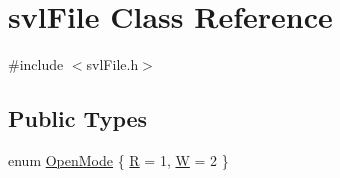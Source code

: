 \hypertarget{classsvl_file}{}\section{svl\+File Class Reference}
\label{classsvl_file}


{\ttfamily \#include $<$svl\+File.\+h$>$}

\subsection*{Public Types}
\begin{DoxyCompactItemize}
\item 
enum \hyperlink{classsvl_file_a457656e908091234c3b92e11596ae1eb}{Open\+Mode} \{ \hyperlink{classsvl_file_a457656e908091234c3b92e11596ae1ebafe4e2c50609d24167be9c0c276c0c6c2}{R} = 1, 
\hyperlink{classsvl_file_a457656e908091234c3b92e11596ae1eba45f29a6a13ea3cf2977585d5f68e5e4b}{W} = 2
 \}
\end{DoxyCompactItemize}
